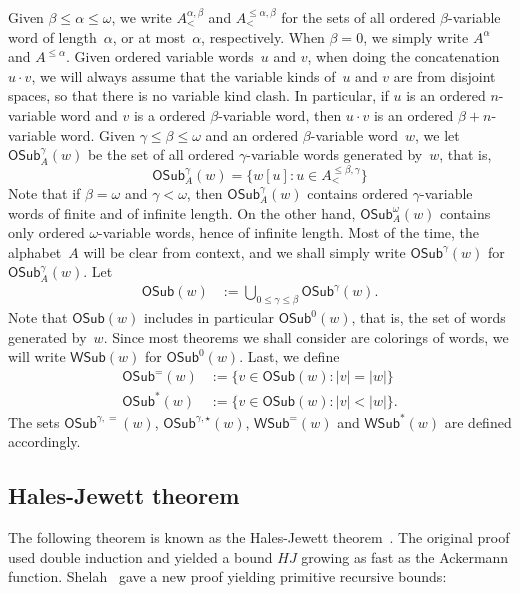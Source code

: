 \documentclass{article}
\def\w{\mathsf{WSub}}
\def\wsamelong{\mathsf{WSub}^{=}}
\def\wshorter{\mathsf{WSub}^{*}}
\def\vw{\mathsf{OSub}}
\def\vwsamelong{\mathsf{OSub}^=}
\def\vwshorter{\mathsf{OSub}^{*}}
\newcommand{\OSub}{\mathsf{OSub}}
\numberwithin{theorem}{section}
\theoremstyle{definition}
\begin{document}
Given $\beta \leq \alpha \leq \omega$, we write $A^{\alpha, \beta}_{<}$ and $A^{\leq\alpha, \beta}_{<}$ for the sets of all ordered $\beta$-variable word of length~$\alpha$, or at most~$\alpha$, respectively. When $\beta = 0$, we simply write $A^\alpha$ and $A^{\leq\alpha}$. Given ordered variable words~$u$ and $v$, when doing the concatenation $u \cdot v$, we will always assume that the variable kinds of~$u$ and $v$ are from disjoint spaces, so that there is no variable kind clash. In particular, if $u$ is an ordered $n$-variable word and $v$ is a ordered $\beta$-variable word, then $u \cdot v$ is an ordered $\beta+n$-variable word.
Given $\gamma \leq \beta \leq \omega$ and an ordered $\beta$-variable word~$w$, we let $\OSub^\gamma_{A}(w)$ be the set of all ordered $\gamma$-variable words generated by~$w$, that is,
$$
\OSub^\gamma_{A}(w) =  \{ w[u] : u \in A^{\leq\beta, \gamma}_{<} \}
$$
Note that if $\beta = \omega$ and $\gamma < \omega$, then $\OSub^\gamma_{A}(w)$ contains ordered $\gamma$-variable words of finite and of infinite length. On the other hand, $\OSub^\omega_A(w)$ contains only ordered $\omega$-variable words, hence of infinite length. Most of the time, the alphabet~$A$ will be clear from context, and we shall simply write $\OSub^\gamma(w)$ for $\OSub^\gamma_A(w)$.
Let
\begin{align}
 \vw(w)&:= \bigcup\limits_{0\leq \gamma\leq \beta}\vw^\gamma(w).
 \end{align}
Note that $\vw(w)$ includes in particular $\vw^0(w)$, that is, the set of words generated by~$w$. Since most theorems we shall consider are colorings of words, we will write $\w(w)$ for $\vw^0(w)$.
Last, we define
\begin{align}\nonumber
\vwsamelong(w) &:= \big\{ v\in \vw(w):|v| = |w|  \big\}\\ \nonumber
\vwshorter(w) &:=
\big\{
v\in\vw(w): |v|<|w|
\big\}.
\end{align}
The sets $\OSub^{\gamma,=}(w)$, $\OSub^{\gamma,\star}(w)$, $\wsamelong(w)$ and $\wshorter(w)$ are defined accordingly.

\subsection{Hales-Jewett theorem}

The following theorem is known as the Hales-Jewett theorem~\cite{hales1963regularity}. The original proof used double induction and yielded a bound $HJ$ growing as fast as the Ackermann function. Shelah~\cite{shelah1988primitive} gave a new proof yielding primitive recursive bounds:
\end{document}
